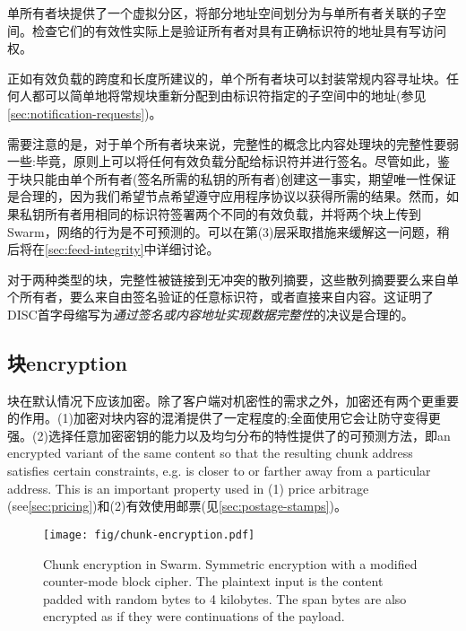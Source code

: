 单所有者块提供了一个虚拟分区，将部分地址空间划分为与单所有者关联的子空间。检查它们的有效性实际上是验证所有者对具有正确标识符的地址具有写访问权。

正如有效负载的跨度和长度所建议的，单个所有者块可以封装常规内容寻址块。任何人都可以简单地将常规块重新分配到由标识符指定的子空间中的地址(参见\ref{sec:notification-requests})。


需要注意的是，对于单个所有者块来说，完整性的概念比内容处理块的完整性要弱一些:毕竟，原则上可以将任何有效负载分配给标识符并进行签名。尽管如此，鉴于块只能由单个所有者(签名所需的私钥的所有者)创建这一事实，期望唯一性保证是合理的，因为我们希望节点希望遵守应用程序协议以获得所需的结果。然而，如果私钥所有者用相同的标识符签署两个不同的有效负载，并将两个块上传到Swarm，网络的行为是不可预测的。可以在第(3)层采取措施来缓解这一问题，稍后将在\ref{sec:feed-integrity}中详细讨论。

对于两种类型的块，完整性被链接到无冲突的散列摘要，这些散列摘要要么来自单个所有者，要么来自由签名验证的任意标识符，或者直接来自内容。这证明了DISC首字母缩写为\emph{通过签名或内容地址实现数据完整性}的决议是合理的。

\subsection{块encryption\statusgreen}\label{sec:chunk-encryption}

块在默认情况下应该加密。除了客户端对机密性的需求之外，加密还有两个更重要的作用。(1)加密对块内容的混淆提供了一定程度的;全面使用它会让防守变得更强。(2)选择任意加密密钥的能力以及均匀分布的特性提供了的可预测方法，即\generating an encrypted variant of the same content so that the resulting chunk address satisfies certain constraints, e.g. is closer to or farther away from a particular address. This is an important property used in (1) price arbitrage (see\ref{sec:pricing})和(2)有效使用邮票(见\ref{sec:postage-stamps})。


\begin{figure}[htbp]
    \centering
    \texttt{[image: fig/chunk-encryption.pdf]}
    \caption[Chunk encryption in Swarm \statusgreen]{Chunk encryption in Swarm. Symmetric encryption with a modified counter-mode block cipher. The plaintext input is the content padded with random bytes to 4 kilobytes. The span bytes are also encrypted as if they were continuations of the payload.}
    \label{fig:chunk-encryption}
\end{figure}


